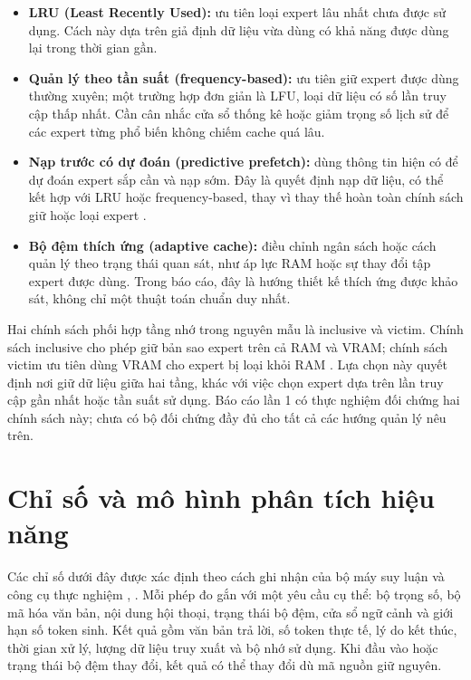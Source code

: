 \begin{itemize}
\item \textbf{LRU (Least Recently Used):} ưu tiên loại expert lâu nhất chưa được sử dụng. Cách này dựa trên giả định dữ liệu vừa dùng có khả năng được dùng lại trong thời gian gần.
\item \textbf{Quản lý theo tần suất (frequency-based):} ưu tiên giữ expert được dùng thường xuyên; một trường hợp đơn giản là LFU, loại dữ liệu có số lần truy cập thấp nhất. Cần cân nhắc cửa sổ thống kê hoặc giảm trọng số lịch sử để các expert từng phổ biến không chiếm cache quá lâu.
\item \textbf{Nạp trước có dự đoán (predictive prefetch):} dùng thông tin hiện có để dự đoán expert sắp cần và nạp sớm. Đây là quyết định nạp dữ liệu, có thể kết hợp với LRU hoặc frequency-based, thay vì thay thế hoàn toàn chính sách giữ hoặc loại expert \cite{moe_offloading}.
\item \textbf{Bộ đệm thích ứng (adaptive cache):} điều chỉnh ngân sách hoặc cách quản lý theo trạng thái quan sát, như áp lực RAM hoặc sự thay đổi tập expert được dùng. Trong báo cáo, đây là hướng thiết kế thích ứng được khảo sát, không chỉ một thuật toán chuẩn duy nhất.
\end{itemize}

Hai chính sách phối hợp tầng nhớ trong nguyên mẫu là inclusive và victim. Chính sách inclusive cho phép giữ bản sao expert trên cả RAM và VRAM; chính sách victim ưu tiên dùng VRAM cho expert bị loại khỏi RAM \cite{moe_tierengine_arch}. Lựa chọn này quyết định nơi giữ dữ liệu giữa hai tầng, khác với việc chọn expert dựa trên lần truy cập gần nhất hoặc tần suất sử dụng. Báo cáo lần 1 có thực nghiệm đối chứng hai chính sách này; chưa có bộ đối chứng đầy đủ cho tất cả các hướng quản lý nêu trên.

\section{Chỉ số và mô hình phân tích hiệu năng}

Các chỉ số dưới đây được xác định theo cách ghi nhận của bộ máy suy luận và công cụ thực nghiệm \cite{moe_tierengine_arch}, \cite{exp_phase1_i5}. Mỗi phép đo gắn với một yêu cầu cụ thể: bộ trọng số, bộ mã hóa văn bản, nội dung hội thoại, trạng thái bộ đệm, cửa sổ ngữ cảnh và giới hạn số token sinh. Kết quả gồm văn bản trả lời, số token thực tế, lý do kết thúc, thời gian xử lý, lượng dữ liệu truy xuất và bộ nhớ sử dụng. Khi đầu vào hoặc trạng thái bộ đệm thay đổi, kết quả có thể thay đổi dù mã nguồn giữ nguyên.

